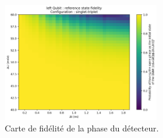 \documentclass{article}
\begin{document}
\begin{figure}[H]
  \centering
  \includegraphics[width=0.6\textwidth]{p_qubit_overlap_map_left_33x33_20250822-064424.png}
  \caption{Carte de fidélité de la phase du détecteur.}
  \label{fig:fidelity_map_1}
\end{figure}
\end{document}
